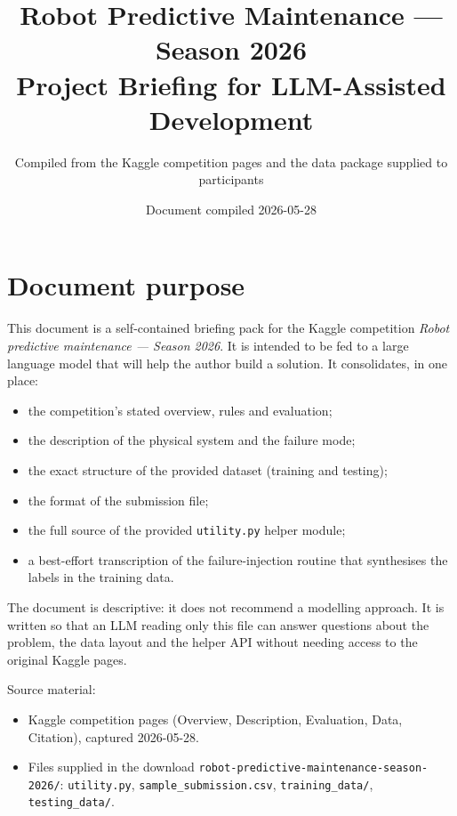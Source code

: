 \documentclass[11pt,a4paper]{article}
\title{\textbf{Robot Predictive Maintenance --- Season 2026}\\[2pt]
       \large Project Briefing for LLM-Assisted Development}
\author{Compiled from the Kaggle competition pages and the data package supplied to participants}
\date{Document compiled 2026-05-28}
\begin{document}
\maketitle
\tableofcontents
\clearpage

\section{Document purpose}
\label{sec:purpose}

This document is a self-contained briefing pack for the Kaggle competition
\emph{Robot predictive maintenance --- Season 2026}. It is intended to be fed to
a large language model that will help the author build a solution. It
consolidates, in one place:

\begin{itemize}[leftmargin=1.4em]
  \item the competition's stated overview, rules and evaluation;
  \item the description of the physical system and the failure mode;
  \item the exact structure of the provided dataset (training and testing);
  \item the format of the submission file;
  \item the full source of the provided \texttt{utility.py} helper module;
  \item a best-effort transcription of the failure-injection routine that
        synthesises the labels in the training data.
\end{itemize}

The document is descriptive: it does not recommend a modelling approach. It is
written so that an LLM reading only this file can answer questions about the
problem, the data layout and the helper API without needing access to the
original Kaggle pages.

Source material:
\begin{itemize}[leftmargin=1.4em]
  \item Kaggle competition pages (Overview, Description, Evaluation, Data,
        Citation), captured 2026-05-28.
  \item Files supplied in the download
        \texttt{robot-predictive-maintenance-season-2026/}:
        \texttt{utility.py}, \texttt{sample\_submission.csv},
        \texttt{training\_data/}, \texttt{testing\_data/}.
\end{itemize}
\end{document}
